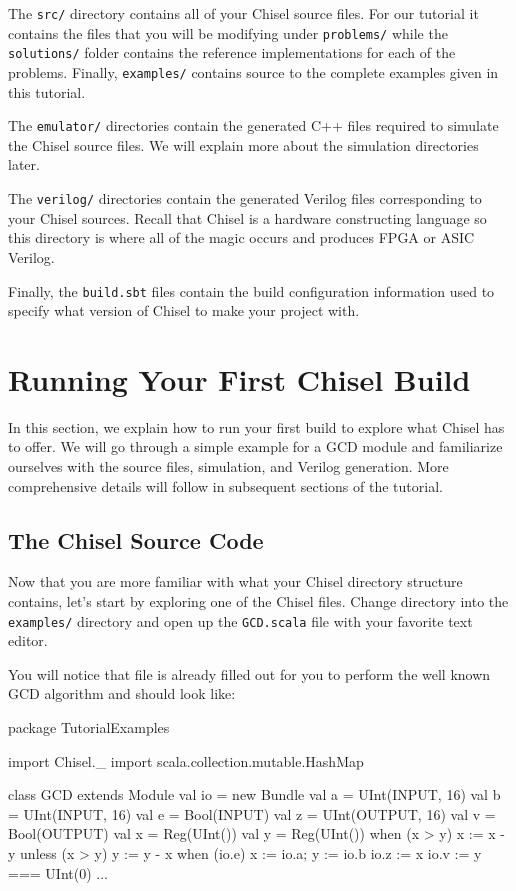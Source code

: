 \documentclass[twocolumn, 10pt]{article}
\begin{document}
The \verb+src/+ directory contains all of your Chisel source files. For our tutorial it contains the files that you will be modifying under \verb+problems/+ while the \verb+solutions/+ folder contains the reference implementations for each of the problems.  Finally, \verb+examples/+ contains source to the complete examples given in this tutorial.

The \verb+emulator/+ directories contain the generated C++ files required to simulate the Chisel source files. We will explain more about the simulation directories later.

The \verb+verilog/+ directories contain the generated Verilog files corresponding to your Chisel sources. Recall that Chisel is a hardware constructing language so this directory is where all of the magic occurs and produces FPGA or ASIC Verilog.

Finally, the \verb+build.sbt+ files contain the build configuration information used to specify what version of Chisel to make your project with.

\section{Running Your First Chisel Build}

In this section, we explain how to run your first build to explore what Chisel has to offer. We will go through a simple example for a GCD module and familiarize ourselves with the source files, simulation, and Verilog generation. More comprehensive details will follow in subsequent sections of the tutorial.

\subsection{The Chisel Source Code}

Now that you are more familiar with what your Chisel directory structure contains, let's start by exploring one of the Chisel files. Change directory into the \verb+examples/+ directory and open up the \verb+GCD.scala+ file with your favorite text editor. 

You will notice that file is already filled out for you to perform the well known GCD algorithm and should look like:

\begin{scala}
package TutorialExamples

import Chisel._
import scala.collection.mutable.HashMap

class GCD extends Module {
  val io = new Bundle {
    val a  = UInt(INPUT,  16)
    val b  = UInt(INPUT,  16)
    val e  = Bool(INPUT)
    val z  = UInt(OUTPUT, 16)
    val v  = Bool(OUTPUT)
  }
  val x  = Reg(UInt())
  val y  = Reg(UInt())
  when   (x > y) { x := x - y } 
  unless (x > y) { y := y - x }
  when (io.e) { x := io.a; y := io.b }
  io.z := x
  io.v := y === UInt(0)
} ...
\end{scala}
\end{document}
